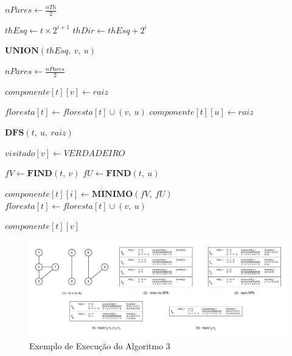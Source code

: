 \documentclass[12pt]{article}
\begin{document}
\begin{algorithm}[H]
{        %
        $nPares \gets \frac{nTh}{2}$\;
        {
            {
                $thEsq \gets t \times 2^{i+1}$\;
                $thDir \gets thEsq + 2^i$\;
                
                {
                    $\textbf{UNION}(thEsq,\ v,\ u)$\;
                }
            }
            $nPares \gets \frac{nPares}{2}$\;
        }
    }
    {
        $componente[t][v] \gets raiz$\;
        
        {
            $floresta[t] \gets floresta[t] \cup (v,\ u)$\;
            $componente[t][u] \gets raiz$\;
            
            {
                {
                    $\textbf{DFS}(t,\ u,\ raiz)$\;
                }
            }
        }
        $visitado[v] \gets VERDADEIRO$\;
    }
    {
        $fV \gets  \textbf{FIND}(t,\ v)$\;
        $fU \gets  \textbf{FIND}(t,\ u)$\;
        
        {
            {
                {
                    $componente[t][i] \gets \textbf{M} \acute{\textbf{I}} \textbf{NIMO}(fV,\ fU)$\;
                }
            }
            $floresta[t] \gets floresta[t] \cup (v,\ u)$\;
        }
    }
    {
        \Return $componente[t][v]$\;
    }
\end{algorithm}

\begin{figure}
\centering
\includegraphics[width=1\textwidth]{tabela_exe_par.pdf}
\caption{Exemplo de Execução do Algoritmo 3}
\label{fig:alg3}
\end{figure}
\end{document}
